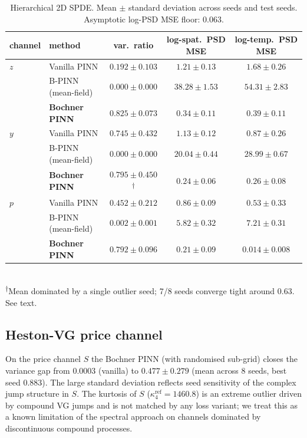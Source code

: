 \documentclass[review,12pt]{elsarticle}
\begin{document}
\begin{table}[h]
\centering
\caption{Hierarchical 2D SPDE. Mean \(\pm\) standard deviation
across seeds and test seeds. Asymptotic log-PSD MSE floor: 0.063.}
\label{tab:hier}
\begin{tabular}{l l c c c}
\toprule
channel & method & var.\ ratio & log-spat.\ PSD MSE & log-temp.\ PSD MSE \\
\midrule
\(z\) & Vanilla PINN     & \(0.192 \pm 0.103\) & \(1.21 \pm 0.13\) & \(1.68 \pm 0.26\) \\
   & B-PINN (mean-field)  & \(0.000 \pm 0.000\) & \(38.28 \pm 1.53\) & \(54.31 \pm 2.83\) \\
   & \textbf{Bochner PINN} & \(\mathbf{0.825 \pm 0.073}\) & \(\mathbf{0.34 \pm 0.11}\) & \(\mathbf{0.39 \pm 0.11}\) \\
\midrule
\(y\) & Vanilla PINN     & \(0.745 \pm 0.432\) & \(1.13 \pm 0.12\) & \(0.87 \pm 0.26\) \\
   & B-PINN (mean-field)  & \(0.000 \pm 0.000\) & \(20.04 \pm 0.44\) & \(28.99 \pm 0.67\) \\
   & \textbf{Bochner PINN} & \(0.795 \pm 0.450\)\textsuperscript{$\dagger$}
                & \(\mathbf{0.24 \pm 0.06}\)
                & \(\mathbf{0.26 \pm 0.08}\) \\
\midrule
\(p\) & Vanilla PINN     & \(0.452 \pm 0.212\) & \(0.86 \pm 0.09\) & \(0.53 \pm 0.33\) \\
   & B-PINN (mean-field)  & \(0.002 \pm 0.001\) & \(5.82 \pm 0.32\) & \(7.21 \pm 0.31\) \\
   & \textbf{Bochner PINN} & \(\mathbf{0.792 \pm 0.096}\)
                & \(\mathbf{0.21 \pm 0.09}\)
                & \(\mathbf{0.014 \pm 0.008}\) \\
\bottomrule
\end{tabular}\\[4pt]
\textsuperscript{$\dagger$}Mean dominated by a single outlier
seed; 7/8 seeds converge tight around $0.63$. See text.
\end{table}

\subsection{Heston-VG price channel}

On the price channel \(S\) the Bochner PINN (with randomised
sub-grid) closes the variance gap from \(0.0003\) (vanilla) to
\(0.477 \pm 0.279\) (mean across 8 seeds, best seed 0.883). The
large standard deviation reflects seed sensitivity of the complex
jump structure in \(S\). The kurtosis of \(S\) (\(\kappa_4^{\mathrm{ref}}
= 1460.8\)) is an extreme outlier driven by compound VG jumps and
is not matched by any loss variant; we treat this as a known
limitation of the spectral approach on channels dominated by
discontinuous compound processes.
\end{document}
